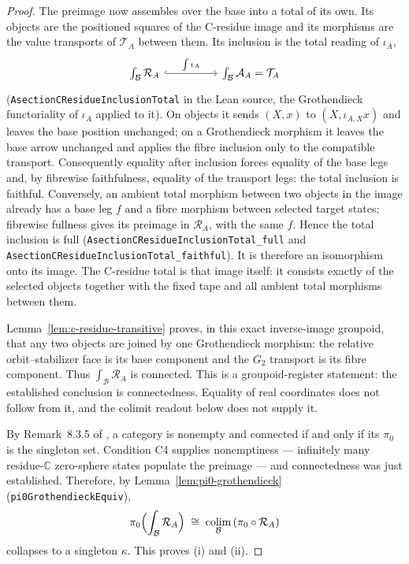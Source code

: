 \documentclass[11pt]{article}
\newcommand{\CC}{\mathbb{C}}
\theoremstyle{plain}
\theoremstyle{definition}
\theoremstyle{remark}
\begin{document}
\begin{proof}
The preimage now assembles over the base into a total of its own. Its objects are the positioned
squares of the C-residue image and its morphisms are the value transports of $\mathcal T_A$
between them. Its inclusion is the total reading of $\iota_A$,
\[
\begin{tikzcd}[column sep=huge]
\int_{\mathcal B}\mathcal R_A \arrow[r, hook, "\int\iota_A"] & \int_{\mathcal B}\mathcal A_A=\mathcal T_A
\end{tikzcd}
\]
\textup{(}\texttt{Asection\-CResidue\-Inclusion\-Total} in the Lean source, the Grothendieck
functoriality of $\iota_A$ applied to it\textup{)}. On objects it sends $(X,x)$ to
$(X,\iota_{A,X}x)$ and leaves the base position unchanged; on a Grothendieck morphism it leaves
the base arrow unchanged and applies the fibre inclusion only to the compatible transport.
Consequently equality after inclusion forces equality of the base legs and, by fibrewise
faithfulness, equality of the transport legs: the total inclusion is faithful. Conversely, an
ambient total morphism between two objects in the image already has a base leg $f$ and a fibre
morphism between selected target states; fibrewise fullness gives its preimage in
$\mathcal R_A$, with the same $f$. Hence the total inclusion is full
\textup{(}\texttt{Asection\-CResidue\-Inclusion\-Total\-\_full} and
\texttt{Asection\-CResidue\-Inclusion\-Total\-\_faithful}\textup{)}. It is therefore an
isomorphism onto its image. The C-residue total is that image itself: it consists exactly of the
selected objects together with the fixed tape and all ambient total morphisms between them.

Lemma~\ref{lem:c-residue-transitive} proves, in this exact inverse-image groupoid, that any
two objects are joined by one Grothendieck morphism: the relative
orbit--stabilizer face is its base component and the $G_2$ transport is its fibre component.
Thus $\int_{\mathcal B}\mathcal R_A$ is connected.  This is a groupoid-register statement:
the established conclusion is connectedness. Equality of real coordinates does not follow from
it, and the colimit readout below does not supply it.

By Remark~8.3.5 of \cite{Riehl}, a category is nonempty and connected if and only if its
$\pi_0$ is the singleton set. Condition C4 supplies nonemptiness --- infinitely many
residue-$\CC$ zero-sphere states populate the preimage --- and connectedness was just
established. Therefore, by Lemma~\ref{lem:pi0-grothendieck}
\textup{(}\texttt{pi0GrothendieckEquiv}\textup{)},
\[
\pi_0\Bigl(\int_{\mathcal B}\mathcal R_A\Bigr)\;\cong\;\operatorname*{colim}_{\mathcal B}\,(\pi_0\circ\mathcal R_A)
\]
collapses to a singleton $\kappa$. This proves (i) and (ii).


\end{proof}
\end{document}
